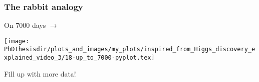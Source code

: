 
\begin{frame}
\frametitle{The rabbit analogy}
\addtocounter{framenumber}{-1}
\transwipe[direction=90]
\begin{center}
\begin{minipage}[c]{.29\textwidth}
On \num{7000} days $\rightarrow$
\end{minipage}
\begin{minipage}[c]{.4\textwidth}
\vspace{-\baselineskip}
\texttt{[image: \\PhDthesisdir/plots\_and\_images/my\_plots/inspired\_from\_Higgs\_discovery\_explained\_video\_3/18-up\_to\_7000-pyplot.tex]}
\end{minipage}
\begin{minipage}[c]{.29\textwidth}
Fill up with more data!
\end{minipage}
\end{center}
\end{frame}


